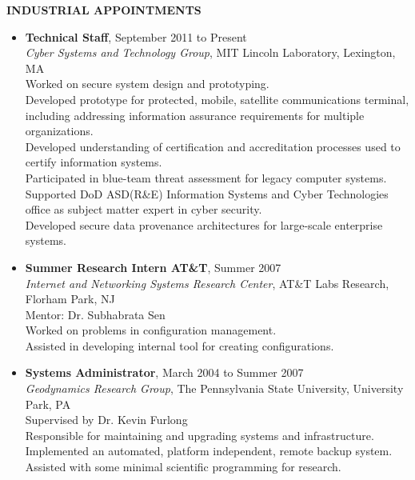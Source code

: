 \documentclass[10pt]{article}
\begin{document}
\vspace{1em} {\large \textbf{INDUSTRIAL APPOINTMENTS}}
\begin{itemize}
\item \textbf{Technical Staff}, September 2011 to Present\\
  \textit{Cyber Systems and Technology Group}, MIT Lincoln Laboratory, Lexington, MA\\
  Worked on secure system design and prototyping.\\
  Developed prototype for protected, mobile, satellite communications terminal, including addressing information assurance requirements for multiple organizations.\\
  Developed understanding of certification and accreditation processes used to certify information systems.\\
  Participated in blue-team threat assessment for legacy computer systems.\\
  Supported DoD ASD(R\&E) Information Systems and Cyber Technologies office as subject matter expert in cyber security.\\
  Developed secure data provenance architectures for large-scale enterprise systems.\\
  
\item \textbf{Summer Research Intern AT\&T}, Summer 2007\\
  \textit{Internet and Networking Systems Research Center}, AT\&T Labs
  Research,
  Florham Park, NJ\\
  Mentor: Dr. Subhabrata Sen\\
  Worked on problems in configuration management.\\
  Assisted in developing internal tool for creating configurations.

\item \textbf{Systems Administrator}, March 2004 to Summer 2007\\
  \textit{Geodynamics Research Group}, The Pennsylvania State University,
  University Park, PA\\
  Supervised by Dr. Kevin Furlong\\
  Responsible for maintaining and upgrading systems and
  infrastructure.\\
  Implemented an automated, platform independent, remote backup
  system.\\
  Assisted with some minimal scientific programming for research.
\end{itemize}
\end{document}

